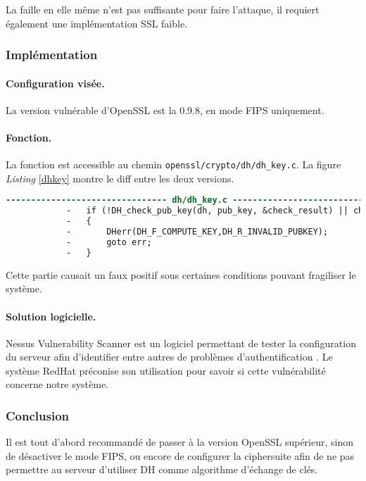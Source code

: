 		La faille en elle même n'est pas suffisante pour faire l'attaque, il requiert également une implémentation SSL faible. 
	
		\subsubsection{Implémentation}
		
			\paragraph{Configuration visée.\\}
		
			La version vulnérable d'OpenSSL est la 0.9.8, en mode FIPS uniquement.

			\paragraph{Fonction.\\}

			La fonction est accessible au chemin \texttt{openssl/crypto/dh/dh\_key.c}. La figure \textit{Listing} \ref{dhkey} montre le diff entre les deux versions.

			\begin{lstlisting}[language=diff,caption=dh\_key.c, label=dhkey]
			-------------------------------- dh/dh_key.c --------------------------------
			-	if (!DH_check_pub_key(dh, pub_key, &check_result) || check_result)
			-	{
			-		DHerr(DH_F_COMPUTE_KEY,DH_R_INVALID_PUBKEY);
			-		goto err;
			-	}
			\end{lstlisting}

			Cette partie causait un faux positif sous certaines conditions pouvant fragiliser le système.

			\paragraph{Solution logicielle.\\}

			Nessus Vulnerability Scanner est un logiciel permettant de tester la configuration du serveur afin d'identifier entre autres de problèmes d'authentification \cite{nessus}. Le système RedHat préconise son utilisation pour savoir si cette vulnérabilité concerne notre système.
		
	\subsubsection{Conclusion}

		Il est tout d'abord recommandé de passer à la version OpenSSL supérieur, sinon de désactiver le mode FIPS, ou encore de configurer la ciphersuite afin de ne pas permettre au serveur d'utiliser DH comme algorithme d'échange de clés.

